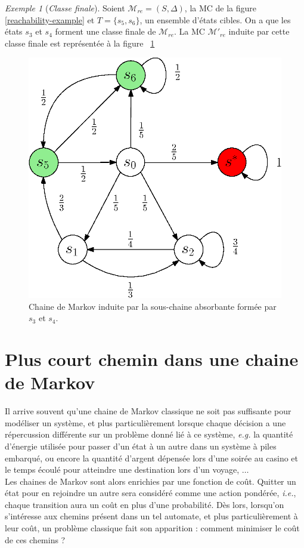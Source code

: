 \documentclass[12pt,a4paper]{report}
\theoremstyle{definition}
\theoremstyle{remark}
\newtheorem{example}{Exemple}[chapter]
\newcommand{\eg}{\textit{e.g.} }
\newcommand{\ie}{\textit{i.e.}, }
\begin{document}
\begin{example}[\textit{Classe finale}]
	Soient $\mathcal{M}_{re} = (S, \Delta)$, la MC de la figure \ref{reachability-example} et $T = \{s_5, s_6\}$, un ensemble d'états cibles. On a que les états $s_3$ et $s_4$ forment une classe finale de $\mathcal{M}_{re}$. La MC $\mathcal{M'}_{re}$ induite par cette classe finale est représentée à la figure ~\ref{absorbing-chain}
		\begin{figure}[H]
		\centering
		\includegraphics[scale=0.7]{figures/absorbing-chain.eps}
		\caption{Chaine de Markov induite par la sous-chaine absorbante formée par $s_3$ et $s_4$.}
		\label{absorbing-chain}
	\end{figure}
\end{example}

\section{Plus court chemin dans une chaine de Markov}
Il arrive souvent qu'une chaine de Markov classique ne soit pas suffisante pour modéliser un système, et plus particulièrement lorsque chaque décision a une répercussion différente sur un problème donné lié à ce système, \eg la quantité d'énergie utilisée pour passer d'un état à un autre dans un système à piles embarqué, ou encore la quantité d'argent dépensée lors d'une soirée au casino et le temps écoulé pour atteindre une destination lors d'un voyage, $\dots$ \\
Les chaines de Markov sont alors enrichies par une fonction de coût. Quitter un état pour en rejoindre un autre sera considéré comme une action pondérée, \ie chaque transition aura un coût en plus d'une probabilité. Dès lors, lorsqu'on s'intéresse aux chemins présent dans un tel automate, et plus particulièrement à leur coût, un problème classique fait son apparition : comment minimiser le coût de ces chemins ?

{}

\end{document}
